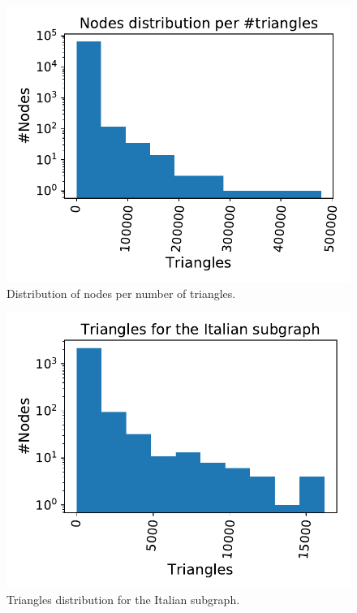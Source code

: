 \documentclass[11pt, twoside]{report}
\begin{document}
\begin{minipage}[b]{0.5\textwidth}
   \centering
    \begin{figure}[H]
      \includegraphics[width=\textwidth]{../../scripts/network_analysis/imgs/triangles_tot.pdf}
          \caption{Distribution of nodes per number of triangles.}
      \label{fig:triangles}
\end{figure}
\end{minipage}
\begin{minipage}[b]{0.5\textwidth}
  \begin{figure}[H]
  \centering
      \includegraphics[width=\textwidth]{../../scripts/network_analysis/imgs/triangles_tot_ita.pdf}
          \caption{ Triangles distribution for the Italian subgraph.}
\end{figure}
\end{minipage}
\end{document}
